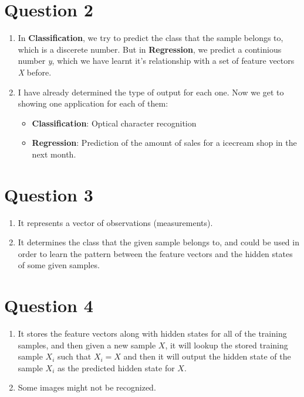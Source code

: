 \documentclass[a4paper,12pt]{article}
\begin{document}
\section*{Question 2}
\begin{enumerate}[label=(\alph*)]
    \item In \textbf{Classification}, we try to predict the class that the sample belongs to, which is a discerete number. But in \textbf{Regression}, we predict a continious number \textit{y}, which we have learnt it's relationship with a set of feature vectors \textit{X} before.
    \item I have already determined the type of output for each one. Now we get to showing one application for each of them: 
    \begin{itemize}
        \item \textbf{Classification}: Optical character recognition
        \item \textbf{Regression}: Prediction of the amount of sales for a icecream shop in the next month.
    \end{itemize} 
\end{enumerate}

\section*{Question 3}
\begin{enumerate}[label=(\alph*)]
    \item It represents a vector of observations (measurements).
    \item It determines the class that the given sample belongs to, and could be used in order to learn the pattern between the feature vectors and the hidden states of some given samples. 
\end{enumerate}

\section*{Question 4}
\begin{enumerate}[label=(\alph*)]
    \item It stores the feature vectors along with hidden states for all of the training samples, and then given a new sample $X$, it will lookup the stored training sample $X_i$ such that $X_i = X$ and then it will output the hidden state of the sample $X_i$ as the predicted hidden state for $X$.
    \item Some images might not be recognized.
\end{enumerate}
\end{document}
